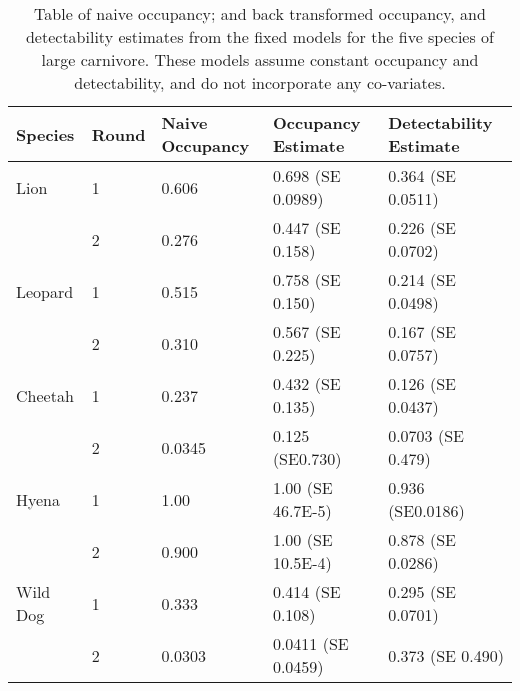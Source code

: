 \begin{table}[h]
	\small
	\begin{center}
		\begin{tabular}{l l l l l}
			\hline \hline		
	Species	& Round 	&Naive Occupancy	&Occupancy Estimate &Detectability Estimate	\\ \hline
	Lion		& 1		&	0.606		&0.698 (SE 0.0989)	& 0.364 (SE 0.0511)	\\	
			& 2		&	0.276		&0.447 (SE 0.158)	& 0.226 (SE 0.0702)	\\	
	Leopard	& 1		&	0.515		&0.758 (SE 0.150)	& 0.214 (SE 0.0498) \\	
			& 2		&	0.310		&0.567 (SE 0.225)	& 0.167 (SE 0.0757)	\\	
	Cheetah	& 1		&	0.237		&0.432 (SE 0.135)	& 0.126 (SE 0.0437) 	\\	
			& 2		&	0.0345		&0.125 (SE0.730)		& 0.0703 (SE 0.479)	\\	
	Hyena	& 1		&	1.00			&1.00 (SE 46.7E-5)	& 0.936 (SE0.0186)	\\	
			& 2		&	0.900		&1.00 (SE 10.5E-4) 	& 0.878 (SE 0.0286)	\\	
	Wild Dog	& 1		&	0.333		&0.414 (SE 0.108)	& 0.295 (SE 0.0701)	\\	
			& 2		&	0.0303		&0.0411 (SE 0.0459)	& 0.373 (SE 0.490)	\\	
			\hline \hline						
		\end{tabular}
		\caption{Table of naive occupancy; and back transformed occupancy, and detectability estimates from the fixed models for the five species of large carnivore. These models assume constant occupancy and detectability, and do not incorporate any co-variates.}
	\label{table:fixed_models}
	\end{center}
\end{table}

